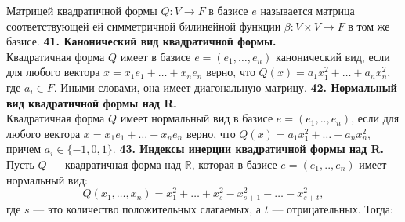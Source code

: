 \documentclass{article}
\begin{document}
Матрицей квадратичной формы $Q \colon V \to F$   в базисе $e$ называется матрица  соответствующей ей симметричной билинейной функции $\beta \colon V \times V \rightarrow F$ в том же базисе. 
\newline
\newline
\textbf{41. Канонический вид квадратичной формы.}\\
Квадратичная форма $Q$ имеет в базисе $e = (e_1, \ldots, e_n)$ канонический вид, если для любого вектора $x = x_1e_1 + \ldots + x_ne_n$ верно, что $Q(x) = a_1x_1^2 +\ldots + a_nx_n^2$, где $a_i \in F$. Иными словами, она имеет диагональную матрицу.
\newline
\newline
\textbf{42. Нормальный вид квадратичной формы над R.}\\
Квадратичная форма $Q$ имеет нормальный вид в базисе $e = (e_1,..,e_n)$, если для любого вектора $x = x_1e_1 + \ldots + x_ne_n$ верно, что $Q(x) = a_1x_1^2 +\ldots + a_nx_n^2$, причем $a_i \in \{-1, 0, 1\}$.  
\newline
\newline
\textbf{43. Индексы инерции квадратичной формы над R.}\\
Пусть $Q$ --- квадратичная форма над $\mathbb{R}$, которая в базисе $e =  (e_1,..,e_n)$ имеет нормальный вид: 
$$
Q(x_1, \ldots, x_n) = x_1^2 + \ldots + x_s^2 - x_{s + 1}^2 - \ldots - x_{s + t}^2,
$$
где $s$ --- это количество положительных слагаемых, а $t$ --- отрицательных. Тогда:
\end{document}
